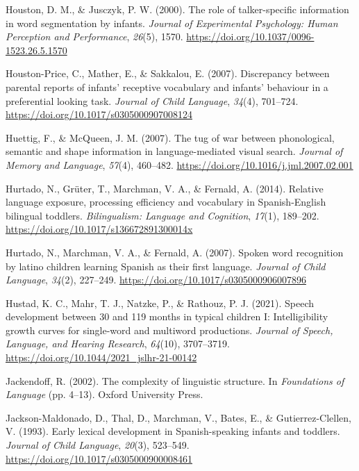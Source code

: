 \documentclass[
  12pt,
  b5paperpaper,
  twoside]{scrreprt}
\newlength{\cslhangindent}
\newlength{\cslentryspacingunit} %
\newenvironment{CSLReferences}[2] %
 {%
  \setlength{\parindent}{0pt}
  \ifodd #1
  \let\oldpar\par
  \def\par{\hangindent=\cslhangindent\oldpar}
  \fi
  \setlength{\parskip}{#2\cslentryspacingunit}
 }%
 {}
\begin{document}
\begin{CSLReferences}{1}{0}
\leavevmode{}%
Houston, D. M., \& Jusczyk, P. W. (2000). The role of talker-specific
information in word segmentation by infants. \emph{Journal of
Experimental Psychology: Human Perception and Performance},
\emph{26}(5), 1570. \url{https://doi.org/10.1037/0096-1523.26.5.1570}

\leavevmode{}%
Houston-Price, C., Mather, E., \& Sakkalou, E. (2007). Discrepancy
between parental reports of infants' receptive vocabulary and infants'
behaviour in a preferential looking task. \emph{Journal of Child
Language}, \emph{34}(4), 701--724.
\url{https://doi.org/10.1017/s0305000907008124}

\leavevmode{}%
Huettig, F., \& McQueen, J. M. (2007). The tug of war between
phonological, semantic and shape information in language-mediated visual
search. \emph{Journal of Memory and Language}, \emph{57}(4), 460--482.
\url{https://doi.org/10.1016/j.jml.2007.02.001}

\leavevmode{}%
Hurtado, N., Grüter, T., Marchman, V. A., \& Fernald, A. (2014).
Relative language exposure, processing efficiency and vocabulary in
{Spanish-English} bilingual toddlers. \emph{Bilingualism: Language and
Cognition}, \emph{17}(1), 189--202.
\url{https://doi.org/10.1017/s136672891300014x}

\leavevmode{}%
Hurtado, N., Marchman, V. A., \& Fernald, A. (2007). Spoken word
recognition by latino children learning {Spanish} as their first
language. \emph{Journal of Child Language}, \emph{34}(2), 227--249.
\url{https://doi.org/10.1017/s0305000906007896}

\leavevmode{}%
Hustad, K. C., Mahr, T. J., Natzke, P., \& Rathouz, P. J. (2021). Speech
development between 30 and 119 months in typical children {I}:
Intelligibility growth curves for single-word and multiword productions.
\emph{Journal of Speech, Language, and Hearing Research}, \emph{64}(10),
3707--3719. \url{https://doi.org/10.1044/2021_jslhr-21-00142}

\leavevmode{}%
Jackendoff, R. (2002). The complexity of linguistic structure. In
\emph{Foundations of {Language}} (pp. 4--13). {Oxford University Press}.

\leavevmode{}%
Jackson-Maldonado, D., Thal, D., Marchman, V., Bates, E., \&
Gutierrez-Clellen, V. (1993). Early lexical development in
{Spanish-speaking} infants and toddlers. \emph{Journal of Child
Language}, \emph{20}(3), 523--549.
\url{https://doi.org/10.1017/s0305000900008461}


\end{CSLReferences}
\end{document}
